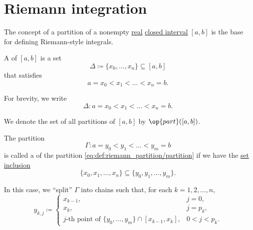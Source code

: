 \section{Riemann integration}\label{sec:riemann_integration}

\begin{definition}\label{def:riemann_partition}
  The concept of a partition of a nonempty \hyperref[def:real_numbers]{real} \hyperref[def:order_interval/closed]{closed interval} \( [a, b] \) is the base for defining Riemann-style integrals.

  \begin{thmenum}
     A  of \( [a, b] \) is a set
    \begin{equation*}
      \Delta \coloneqq \{ x_0, \ldots, x_n \} \subseteq [a, b]
    \end{equation*}
    that satisfies
    \begin{equation*}
      a = x_0 < x_1 < \ldots < x_n = b.
    \end{equation*}

    For brevity, we write
    \begin{equation}\label{eq:def:riemann_partition/partition}
      \Delta: a = x_0 < x_1 < \ldots < x_n = b.
    \end{equation}

    We denote the set of all partitions of \( [a, b] \) by \( \op{part}([a, b]) \).

     The partition
    \begin{equation*}
      \Gamma: a = y_0 < y_1 < \ldots < y_m = b
    \end{equation*}
    is called a  of the partition \eqref{eq:def:riemann_partition/partition} if we have the \hyperref[def:subset]{set inclusion}
    \begin{equation}\label{eq:def:riemann_partition/refinement/inclusion}
      \{ x_0, x_1, \ldots, x_n \} \subseteq \{ y_0, y_1, \ldots, y_m \}.
    \end{equation}

    In this case, we \enquote{split} \( \Gamma \) into chains such that, for each \( k = 1, 2, \ldots, n \),
    \begin{equation}\label{def:riemann_partition/refinement/splitting}
      y_{k,j} \coloneqq \begin{cases}
        x_{k-1},                                                                          &j = 0, \\
        x_k,                                                                              &j = p_k, \\
        j\text{-th point of } \{ y_0, \ldots, y_m \} \cap [x_{k-1}, x_k], &0 < j < p_k.
      \end{cases}
    \end{equation}


\end{thmenum}
\end{definition}
